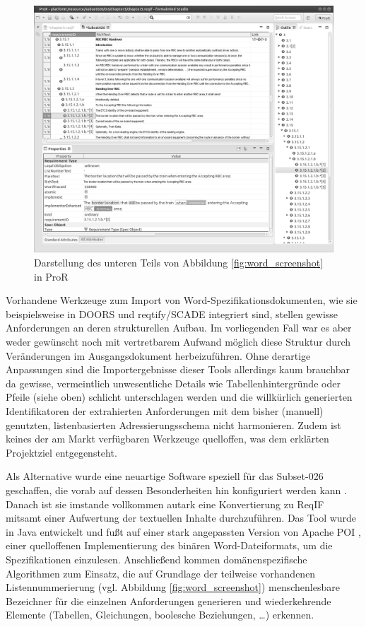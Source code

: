 \documentclass[twoside]{article}
\begin{document}
\begin{multicols}{2}
\begin{figure}
\centering
\includegraphics[width=\linewidth]{img/pror_screenshot.png}
\caption{Darstellung des unteren Teils von Abbildung \ref{fig:word_screenshot} in ProR}
\label{fig:pror_screenshot}
\end{figure}

Vorhandene Werkzeuge zum Import von Word-Spezifikationsdokumenten, wie sie beispielsweise in DOORS und reqtify/SCADE integriert sind, stellen gewisse Anforderungen an deren strukturellen Aufbau. Im vorliegenden Fall war es aber weder gewünscht noch mit vertretbarem Aufwand möglich diese Struktur durch Veränderungen im Ausgangsdokument herbeizuführen. Ohne derartige Anpassungen sind die Importergebnisse dieser Tools allerdings kaum brauchbar da gewisse, vermeintlich unwesentliche Details wie Tabellenhintergründe oder Pfeile (siehe oben) schlicht unterschlagen werden und die willkürlich generierten Identifikatoren der extrahierten Anforderungen mit dem bisher (manuell) genutzten, listenbasierten Adressierungsschema nicht harmonieren. Zudem ist keines der am Markt verfügbaren Werkzeuge quelloffen, was dem erklärten Projektziel entgegensteht.

Als Alternative wurde eine neuartige Software speziell für das \glqq{}Subset-026\grqq{} geschaffen, die vorab auf dessen Besonderheiten hin konfiguriert werden kann \cite{subset026reader}. Danach ist sie imstande vollkommen autark eine Konvertierung zu ReqIF mitsamt einer Aufwertung der textuellen Inhalte durchzuführen. Das Tool wurde in Java entwickelt und fußt auf einer stark angepassten Version von Apache POI \cite{poi}, einer quelloffenen Implementierung des binären Word-Dateiformats, um die Spezifikationen einzulesen. Anschließend kommen domänenspezifische Algorithmen zum Einsatz, die auf Grundlage der teilweise vorhandenen Listennummerierung (vgl. Abbildung \ref{fig:word_screenshot}) menschenlesbare Bezeichner für die einzelnen Anforderungen generieren und wiederkehrende Elemente (Tabellen, Gleichungen, boolesche Beziehungen, \ldots{}) erkennen.


\end{multicols}
\end{document}
